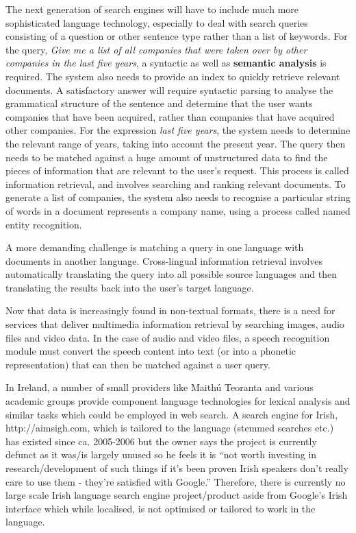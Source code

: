\documentclass[]{../../metanetpaper}
\begin{document}
\begin{multicols}{2}

The next generation of search engines will have to include much more sophisticated language technology, especially to deal with search queries consisting of a question or other sentence type rather than a list of keywords. For the query, \textit{Give me a list of all companies that were taken over by other companies in the last five years}, a syntactic as well as \textbf{semantic analysis} is required. The system also needs to provide an index to quickly retrieve relevant documents. A satisfactory answer will require syntactic parsing to analyse the grammatical structure of the sentence and determine that the user wants companies that have been acquired, rather than companies that have acquired other companies. For the expression \textit{last five years}, the system needs to determine the relevant range of years, taking into account the present year. The query then needs to be matched against a huge amount of unstructured data to find the pieces of information that are relevant to the user's request. This process is called information retrieval, and involves searching and ranking relevant documents. To generate a list of companies, the system also needs to recognise a particular string of words in a document represents a company name, using a process called named entity recognition.

A more demanding challenge is matching a query in one language with documents in another language. Cross-lingual information retrieval involves automatically translating the query into all possible source languages and then translating the results back into the user's target language.

Now that data is increasingly found in non-textual formats, there is a need for services that deliver multimedia information retrieval by searching images, audio files and video data. In the case of audio and video files, a speech recognition module must convert the speech content into text (or into a phonetic representation) that can then be matched against a user query.

In Ireland, a number of small providers like Maithú Teoranta and various academic groups provide component language technologies for lexical analysis and similar tasks which could be employed in web search. A search engine for Irish, http://aimsigh.com, which is tailored to the language (stemmed searches etc.) has existed since ca. 2005-2006 but the owner says the project is currently defunct as it was/is largely unused so he feels it is ``not worth investing in research/development of such things if it's been proven Irish speakers don't really care to use them - they're satisfied with Google.'' Therefore, there is currently no large scale Irish language search engine project/product aside from Google’s Irish interface which while localised, is not optimised or tailored to work in the language.


\end{multicols}
\end{document}
